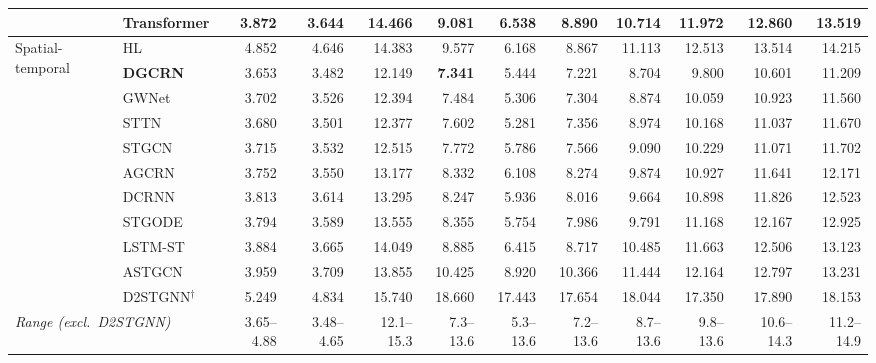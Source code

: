 \documentclass[a4paper]{cas-sc}
\begin{document}
\begin{table}[htbp]
{\begin{tabular}{ll r r r r | r r r r r r}
 & \textbf{Transformer} & 3.872 & 3.644 & 14.466 & \textbf{9.081} &  6.538 &  8.890 & 10.714 & 11.972 & 12.860 & 13.519 \\
\midrule
\multirow{11}{*}{Spatial-temporal}
 & HL               & 4.852 & 4.646 & 14.383 &  9.577 &  6.168 &  8.867 & 11.113 & 12.513 & 13.514 & 14.215 \\
 & \textbf{DGCRN}   & 3.653 & 3.482 & 12.149 & \textbf{7.341} & 5.444 &  7.221 &  8.704 &  9.800 & 10.601 & 11.209 \\
 & GWNet            & 3.702 & 3.526 & 12.394 &  7.484 &  5.306 &  7.304 &  8.874 & 10.059 & 10.923 & 11.560 \\
 & STTN             & 3.680 & 3.501 & 12.377 &  7.602 &  5.281 &  7.356 &  8.974 & 10.168 & 11.037 & 11.670 \\
 & STGCN            & 3.715 & 3.532 & 12.515 &  7.772 &  5.786 &  7.566 &  9.090 & 10.229 & 11.071 & 11.702 \\
 & AGCRN            & 3.752 & 3.550 & 13.177 &  8.332 &  6.108 &  8.274 &  9.874 & 10.927 & 11.641 & 12.171 \\
 & DCRNN            & 3.813 & 3.614 & 13.295 &  8.247 &  5.936 &  8.016 &  9.664 & 10.898 & 11.826 & 12.523 \\
 & STGODE           & 3.794 & 3.589 & 13.555 &  8.355 &  5.754 &  7.986 &  9.791 & 11.168 & 12.167 & 12.925 \\
 & LSTM-ST          & 3.884 & 3.665 & 14.049 &  8.885 &  6.415 &  8.717 & 10.485 & 11.663 & 12.506 & 13.123 \\
 & ASTGCN           & 3.959 & 3.709 & 13.855 & 10.425 &  8.920 & 10.366 & 11.444 & 12.164 & 12.797 & 13.231 \\
 & D2STGNN$^\dagger$& 5.249 & 4.834 & 15.740 & 18.660 & 17.443 & 17.654 & 18.044 & 17.350 & 17.890 & 18.153 \\
\midrule
\multicolumn{2}{l}{\textit{Range (excl.\ D2STGNN)}} & 3.65--4.88 & 3.48--4.65 & 12.1--15.3 & 7.3--13.6 & 5.3--13.6 & 7.2--13.6 & 8.7--13.6 & 9.8--13.6 & 10.6--14.3 & 11.2--14.9 \\
\bottomrule
\end{tabular}}
\end{table}
\end{document}
